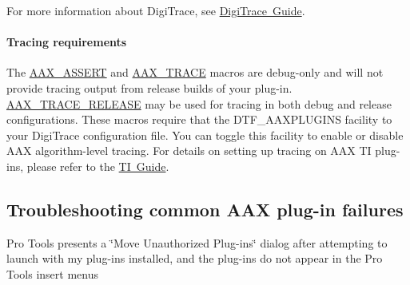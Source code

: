 For more information about Digi\+Trace, see \mbox{\hyperlink{a00834}{Digi\+Trace Guide}}.

\hypertarget{a00830_subsubsection__tracing_requirements}{}\paragraph{Tracing requirements}\label{a00830_subsubsection__tracing_requirements}
 The \mbox{\hyperlink{a00395_a168ee44fd7a5485ab50160db36fb2988}{A\+A\+X\+\_\+\+A\+S\+S\+E\+RT}} and \mbox{\hyperlink{a00395_ab53f1d6a94f8b6ebb3a101f71bfe4e82}{A\+A\+X\+\_\+\+T\+R\+A\+CE}} macros are debug-\/only and will not provide tracing output from release builds of your plug-\/in. \mbox{\hyperlink{a00395_ac2aa820ece56bb59140ad561218db4b3}{A\+A\+X\+\_\+\+T\+R\+A\+C\+E\+\_\+\+R\+E\+L\+E\+A\+SE}} may be used for tracing in both debug and release configurations. These macros require that the {\ttfamily D\+T\+F\+\_\+\+A\+A\+X\+P\+L\+U\+G\+I\+NS} facility to your Digi\+Trace configuration file. You can toggle this facility to enable or disable A\+AX algorithm-\/level tracing. For details on setting up tracing on A\+AX TI plug-\/ins, please refer to the \mbox{\hyperlink{a00832}{TI Guide}}.



 \hypertarget{a00830_aax_pro_tools_guide_06b_troubleshooting_aax_plugin_failures}{}\subsection{Troubleshooting common A\+A\+X plug-\/in failures}\label{a00830_aax_pro_tools_guide_06b_troubleshooting_aax_plugin_failures}
 Pro Tools presents a \char`\"{}\+Move Unauthorized Plug-\/ins\char`\"{} dialog after attempting to launch with my plug-\/ins installed, and the plug-\/ins do not appear in the Pro Tools insert menus 



